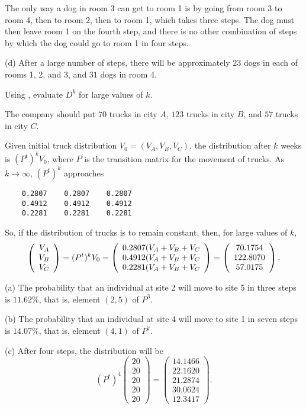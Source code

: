 \documentclass{ximera}
\begin{document}
\soln The only way a dog in room 3 can get to room 1
is by going from room 3 to room 4, then to room 2, then to room 1, which
takes three steps.  The dog must then leave room 1 on the fourth step,
and there is no other combination of steps by which the dog could go to
room 1 in four steps.

(d) \ans After a large number of steps, there will be approximately $23$
dogs in each of rooms 1, 2, and 3, and $31$ dogs in room 4.

\soln Using \Matlab, evaluate $D^k$ for large values of $k$.

\ans The company should put $70$ trucks in city $A$, $123$ trucks in city
$B$, and $57$ trucks in city $C$.

\soln Given initial truck distribution $V_0 = (V_A,V_B,V_C)$, the
distribution after $k$ weeks is $(P^t)^kV_0$, where $P$ is the transition
matrix for the movement of trucks.  As $k \rightarrow \infty$, $(P^t)^k$
approaches
\begin{verbatim}
    0.2807    0.2807    0.2807
    0.4912    0.4912    0.4912
    0.2281    0.2281    0.2281
\end{verbatim}
So, if the distribution of trucks is to remain constant, then, for large
values of $k$,
\[
\left(\begin{array}{r} V_A \\ V_B \\ V_C\end{array}\right) = (P^t)^kV_0 = \left(\begin{array}{c} 0.2807(V_A +
V_B + V_C \\ 0.4912(V_A + V_B + V_C \\ 0.2281(V_A + V_B + V_C\end{array}\right) =
\left(\begin{array}{c} 70.1754 \\ 122.8070 \\ 57.0175\end{array}\right).
\]

(a) The probability that an individual at site 2 will move to site 5 in
three steps is $11.62\%$, that is, element $(2,5)$ of $P^3$.

(b) The probability that an individual at site 4 will move to site 1 in
seven steps is $14.07\%$, that is, element $(4,1)$ of $P^7$.

(c) After four steps, the distribution will be
\[ (P^t)^4\left(\begin{array}{r} 20 \\ 20 \\ 20 \\ 20 \\ 20
\end{array}\right) = \left(\begin{array}{r} 14.1466 \\ 22.1620 \\
21.2874 \\ 30.0624 \\ 12.3417 \end{array}\right). \]
\end{document}
